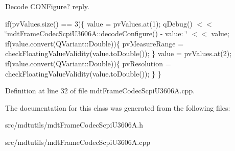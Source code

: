 Decode CONFigure? reply. 



if(pvValues.size() == 3)\{ value = pvValues.at(1); qDebug() $<$$<$ \char`\"{}mdtFrameCodecScpiU3606A::decodeConfigure() -\/ value: \char`\"{} $<$$<$ value; if(value.convert(QVariant::Double))\{ pvMeasureRange = checkFloatingValueValidity(value.toDouble()); \} value = pvValues.at(2); if(value.convert(QVariant::Double))\{ pvResolution = checkFloatingValueValidity(value.toDouble()); \} \}



Definition at line 32 of file mdtFrameCodecScpiU3606A.cpp.



The documentation for this class was generated from the following files:\begin{DoxyCompactItemize}
\item 
src/mdtutils/mdtFrameCodecScpiU3606A.h\item 
src/mdtutils/mdtFrameCodecScpiU3606A.cpp\end{DoxyCompactItemize}
